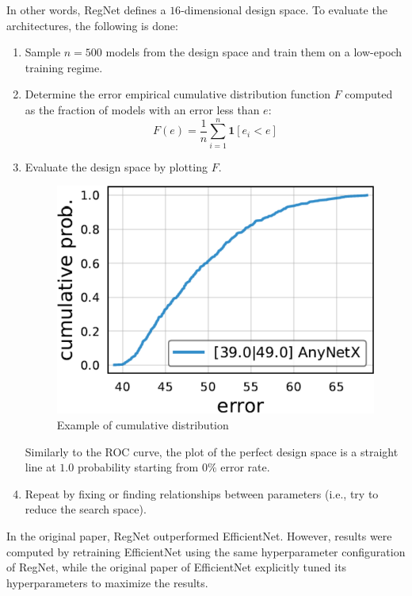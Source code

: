 \begin{description}
        In other words, RegNet defines a $16$-dimensional design space. To evaluate the architectures, the following is done:
        \begin{enumerate}
            \item Sample $n=500$ models from the design space and train them on a low-epoch training regime.
            \item Determine the error empirical cumulative distribution function $F$ computed as the fraction of models with an error less than $e$:
            \[ F(e) = \frac{1}{n} \sum_{i=1}^{n} \mathbf{1}[e_i < e] \]
            \item Evaluate the design space by plotting $F$.
                \begin{figure}[H]
                    \centering
                    \includegraphics[width=0.25\linewidth]{./img/edf.png}
                    \caption{Example of cumulative distribution}
                \end{figure}

                \begin{remark}
                    Similarly to the ROC curve, the plot of the perfect design space is a straight line at $1.0$ probability starting from $0\%$ error rate.
                \end{remark}
            \item Repeat by fixing or finding relationships between parameters (i.e., try to reduce the search space).
        \end{enumerate}
\end{description}

\begin{remark}
    In the original paper, RegNet outperformed EfficientNet. However, results were computed by retraining EfficientNet using the same hyperparameter configuration of RegNet, while the original paper of EfficientNet explicitly tuned its hyperparameters to maximize the results.
\end{remark}